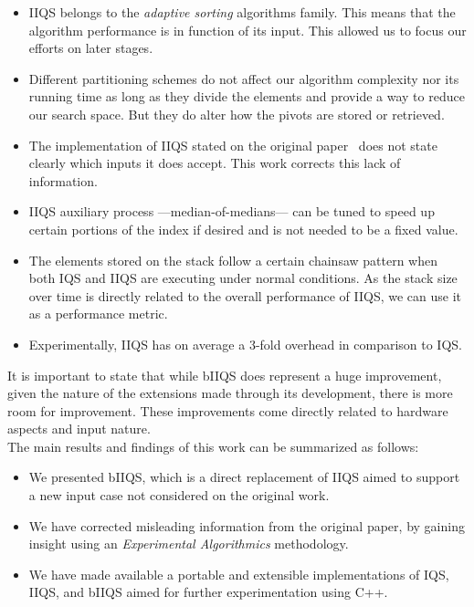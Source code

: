 \begin{itemize}
    \item IIQS belongs to the \emph{adaptive sorting} algorithms family. This means that the algorithm performance is in function of its input. This allowed us to focus our efforts on later stages.
    \item Different partitioning schemes do not affect our algorithm complexity nor its running time as long as they divide the elements and provide a way to reduce our search space. But they do alter how the pivots are stored or retrieved.
    \item The implementation of IIQS stated on the original paper~\cite{7416566} does not state clearly which inputs it does accept. This work corrects this lack of information.
    \item IIQS auxiliary process ---median-of-medians--- can be tuned to speed up certain portions of the index if desired and is not needed to be a fixed value.
    \item The elements stored on the stack follow a certain chainsaw pattern when both IQS and IIQS are executing under normal conditions. As the stack size over time is directly related to the overall performance of IIQS, we can use it as a performance metric.
    \item Experimentally, IIQS has on average a 3-fold overhead in comparison to IQS.
\end{itemize}


It is important to state that while bIIQS does represent a huge improvement, given the nature of the extensions made through its development, there is more room for improvement. These improvements come directly related to hardware aspects and input nature.\\

The main results and findings of this work can be summarized as follows:
\begin{itemize}
    \item We presented bIIQS, which is a direct replacement of IIQS aimed to support a new input case not considered on the original work.
    \item We have corrected misleading information from the original paper, by gaining insight using an \emph{Experimental Algorithmics} methodology.
    \item We have made available a portable and extensible implementations of IQS, IIQS, and bIIQS aimed for further experimentation using C++.
\end{itemize}

